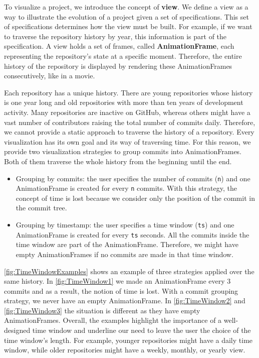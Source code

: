 To visualize a project, we introduce the concept of \textbf{view}. We define a view as a way to illustrate the evolution of a project given a set of specifications. This set of specifications determines how the view must be built. For example, if we want to traverse the repository history by year, this information is part of the specification. A view holds a set of frames, called \textbf{AnimationFrame}, each representing the repository's state at a specific moment. Therefore, the entire history of the repository is displayed by rendering these AnimationFrames consecutively, like in a movie. 

Each repository has a unique history. There are young repositories whose history is one year long and old repositories with more than ten years of development activity. Many repositories are inactive on GitHub, whereas others might have a vast number of contributors raising the total number of commits daily. Therefore, we cannot provide a static approach to traverse the history of a repository. 
Every visualization has its own goal and its way of traversing time. For this reason, we provide two visualization strategies to group commits into AnimationFrames. Both of them traverse the whole history from the beginning until the end.
\begin{itemize}
    \item{Grouping by commits}: the user specifies the number of commits (\texttt{n}) and one AnimationFrame is created for every \texttt{n} commits. With this strategy, the concept of time is lost because we consider only the position of the commit in the commit tree.
    \item{Grouping by timestamp}: the user specifies a time window (\texttt{ts}) and one AnimationFrame is created for every \texttt{ts} seconds. All the commits inside the time window are part of the AnimationFrame. Therefore, we might have empty AnimationFrames if no commits are made in that time window.
\end{itemize}

\autoref{fig:TimeWindowExamples} shows an example of three strategies applied over the same history. In \autoref{fig:TimeWindow1} we made an AnimationFrame every 3 commits and as a result, the notion of time is lost. With a commit grouping strategy, we never have an empty AnimationFrame. In \autoref{fig:TimeWindow2} and \autoref{fig:TimeWindow3} the situation is different as they have empty AnimationFrames.
Overall, the examples highlight the importance of a well-designed time window and underline our need to leave the user the choice of the time window's length. For example, younger repositories might have a daily time window, while older repositories might have a weekly, monthly, or yearly view. 

